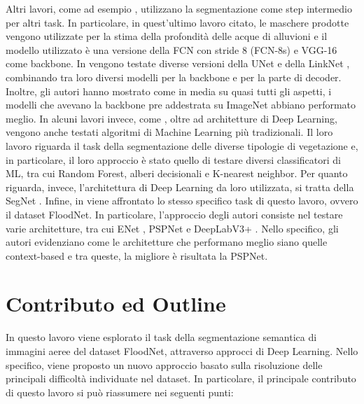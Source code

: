 Altri lavori, come ad esempio \cite{three_dim}, utilizzano la segmentazione come step intermedio per altri task. In particolare, in quest'ultimo lavoro citato, le maschere prodotte vengono utilizzate per la stima della profondità delle acque di alluvioni e il modello utilizzato è una versione della FCN \cite{FCNs} con stride 8 (FCN-8s) e VGG-16 come backbone. In \cite{deep-based} vengono testate diverse versioni della UNet \cite{unet} e della LinkNet \cite{linknet}, combinando tra loro diversi modelli per la backbone e per la parte di decoder. Inoltre, gli autori hanno mostrato come in media su quasi tutti gli aspetti, i modelli che avevano la backbone pre addestrata su ImageNet abbiano performato meglio. In alcuni lavori invece, come \cite{sem_seg_ML}, oltre ad architetture di Deep Learning, vengono anche testati algoritmi di Machine Learning più tradizionali. Il loro lavoro riguarda il task della segmentazione delle diverse tipologie di vegetazione e, in particolare, il loro approccio è stato quello di testare diversi classificatori di ML, tra cui Random Forest, alberi decisionali e K-nearest neighbor. Per quanto riguarda, invece, l'architettura di Deep Learning da loro utilizzata, si tratta della SegNet \cite{segnet}. Infine, in \cite{floodnet} viene affrontato lo stesso specifico task di questo lavoro, ovvero il dataset FloodNet. In particolare, l'approccio degli autori consiste nel testare varie architetture, tra cui ENet \cite{enet}, PSPNet \cite{pspnet} e DeepLabV3+ \cite{deeplabv3+}. Nello specifico, gli autori evidenziano come le architetture che performano meglio siano quelle context-based e tra queste, la migliore è risultata la PSPNet.





















\section{Contributo ed Outline}
In questo lavoro viene esplorato il task della segmentazione semantica di immagini aeree del dataset FloodNet, attraverso approcci di Deep Learning. Nello specifico, viene proposto un nuovo approccio basato sulla risoluzione delle principali difficoltà individuate nel dataset. 
In particolare, il principale contributo di questo lavoro si può riassumere nei seguenti punti:


